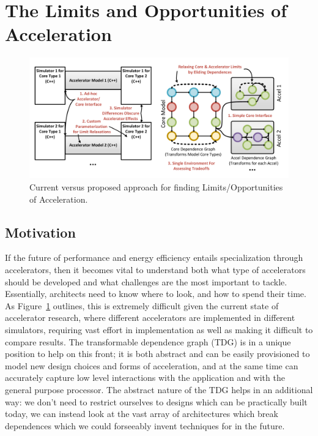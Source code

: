 \section{The Limits and Opportunities of Acceleration} \label{sec:limits}

\begin{figure}
  \begin{center}
    \includegraphics[width=0.85\linewidth]{figs/modeling-overview.pdf}
  \end{center}
\vspace{-0.2in}
  \caption{Current versus proposed approach for finding Limits/Opportunities of Acceleration.}
  \label{fig:modeling-overview}
\vspace{-0.05in}
\end{figure}


\subsection{Motivation}
If the future of performance and energy efficiency entails specialization
through accelerators, then it becomes vital to understand both what
type of accelerators should be developed and what challenges are the most
important to tackle.  Essentially, architects need to know where to look,
and how to spend their time.  As Figure~\ref{fig:modeling-overview} outlines,
this is extremely difficult given the current state of accelerator research,
where different accelerators are implemented in different simulators, requiring
vast effort  in implementation as well as making it difficult to compare results.
The transformable dependence graph (TDG)
is in a unique position to help on this front; it is both abstract and 
can be easily provisioned to model new design choices and forms of acceleration,
and at the same time can accurately capture low level interactions with
the application and with the general purpose processor.  The abstract nature
of the TDG helps in an additional way: we don't need to restrict ourselves to
designs which can be practically built today, we can instead look at the vast array
of architectures which break dependences which we could forseeably invent techniques
for in the future.

